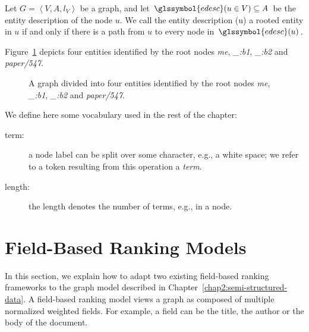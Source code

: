 \begin{definition}
Let $G = \left\langle V, A, l_V \right\rangle$ be a graph, and let $\glssymbol{edesc}(u \in V) \subseteq A$ be the entity description of the node $u$. We call the entity description (u) a rooted entity in $u$ if and only if there is a path from $u$ to every node in $\glssymbol{edesc}(u)$.
\end{definition}

Figure~\ref{fig:entities} depicts four entities identified by the root nodes \emph{me}, \emph{\_:b1}, \emph{\_:b2} and \emph{paper/547}.

\begin{figure}
	\centering
	\caption{A graph divided into four entities identified by the root nodes \emph{me}, \emph{\_:b1}, \emph{\_:b2} and \emph{paper/547}.}
	\label{fig:entities}
\end{figure}

We define here some vocabulary used in the rest of the chapter:
\begin{description}
	\item[term:] a node label can be split over some character, e.g., a white space; we refer to a token resulting from this operation a \emph{term}.
	\item[length:] the length denotes the number of terms, e.g., in a node.
\end{description}

\section{Field-Based Ranking Models}
\label{sec:ranking-wod}

In this section, we explain how to adapt two existing \gls{field}-based ranking frameworks to the graph model described in Chapter~\ref{chap2:semi-structured-data}.
A field-based ranking model views a graph as composed of multiple normalized weighted fields. For example, a field can be the title, the author or the body of the document.\\


